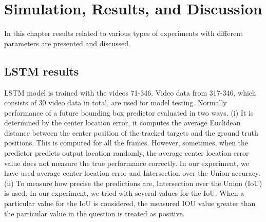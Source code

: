 \chapter{Simulation, Results, and Discussion}

In this chapter results related to various types of experiments with different parameters are presented and discussed.

\section{LSTM results} \label{observations}
LSTM model is trained with the videos 71-346. Video data from 317-346, which consists of 30 video data in total, are used for model testing. Normally performance of a future bounding box predictor evaluated  in two ways. 
(i) It is determined by the center location error, it computes the average
Euclidean distance between the center position of the tracked targets and the ground truth
positions. This is computed for all the frames. However, sometimes, when the predictor predicts 
output location randomly, the average center location error value does not measure the
true performance correctly. In our experiment, we have used average center location error and Intersection over the Union  accuracy. \\

(ii) To measure how precise the predictions are, Intersection over the Union (IoU) is used. In our experiment, we tried with several values for the IoU. When a particular value for the IoU is considered, the measured IOU value greater than the particular value in the question is treated as positive.

